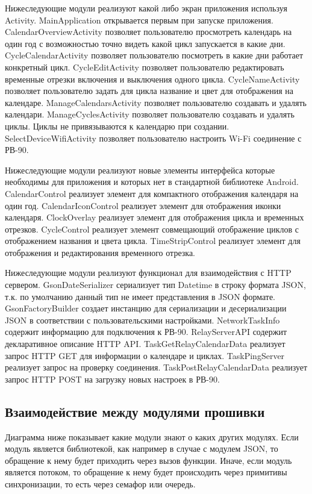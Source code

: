 Нижеследующие модули реализуют какой либо экран приложения используя Activity. 
MainApplication открывается первым при запуске приложения. 
CalendarOverviewActivity позволяет пользователю просмотреть календарь на один год с возможностью точно видеть какой цикл запускается в какие дни.
CycleCalendarActivity позволяет пользователю посмотреть в какие дни работает конкретный цикл.
CycleEditActivity позволяет пользователю редактировать временные отрезки включения и выключения одного цикла.
CycleNameActivity позволяет пользователю задать для цикла название и цвет для отображения на календаре.
ManageCalendarsActivity позволяет пользователю создавать и удалять календари.
ManageCyclesActivity позволяет пользователю создавать и удалять циклы. Циклы не привязываются к календарю при создании.
SelectDeviceWifiActivity позволяет пользователю настроить Wi-Fi соединение с РВ-90.

Нижеследующие модули реализуют новые элементы интерфейса которые необходимы для приложения и которых нет в стандартной библиотеке Android.  
CalendarControl реализует элемент для компактного отображения календаря на один год.
CalendarIconControl реализует элемент для отображения иконки календаря.
ClockOverlay реализует элемент для отображения цикла и временных отрезков.
CycleControl реализует элемент совмещающий отображение циклов с отображением названия и цвета цикла.
TimeStripControl реализует элемент для отображения и редактирования временного отрезка.

Нижеследующие модули реализуют функционал для взаимодействия с HTTP сервером.  
GsonDateSerializer сериализует тип Datetime в строку формата JSON, т.к. по умолчанию данный тип не имеет представления в JSON формате.
GsonFactoryBuilder создает инстанцию для сериализации и десериализации JSON в соответствии с пользовательскими настройками.
NetworkTaskInfo содержит информацию для подключения к РВ-90. 
RelayServerAPI содержит декларативное описание HTTP API.
TaskGetRelayCalendarData реализует запрос HTTP GET для информации о календаре и циклах.
TaskPingServer реализует запрос на проверку соединения.
TaskPostRelayCalendarData реализует запрос HTTP POST на загрузку новых настроек в РВ-90.







\newpage
\subsection{Взаимодействие между модулями прошивки}
Диаграмма ниже показывает какие модули знают о каких других модулях. Если модуль является библиотекой, как например в случае с модулем JSON, то обращение к нему будет приходить через вызов функции. Иначе, если модуль является потоком, то обращение к нему будет происходить через примитивы синхронизации, то есть через семафор или очередь.

